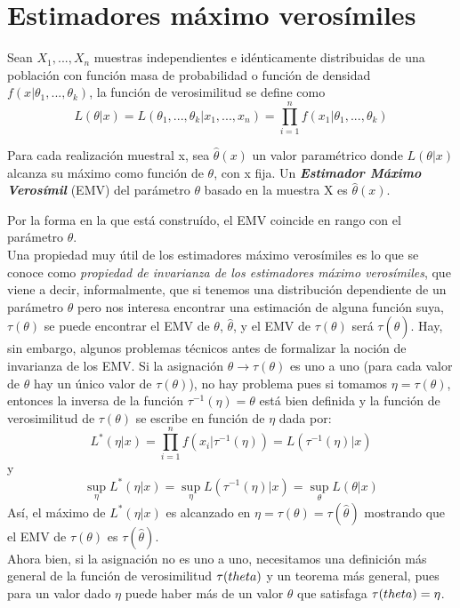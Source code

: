 \section{Estimadores máximo verosímiles}\label{st:emv}
Sean $X_{1},...,X_{n}$ muestras independientes e idénticamente distribuidas de una población con función masa de probabilidad o función de densidad $f(x \vert \theta_{1},...,\theta_{k})$, la función de verosimilitud se define como
\[ L(\theta \vert x)=L(\theta_{1},...,\theta_{k} \vert x_{1},...,x_{n})=\prod_{i=1}^{n} f(x_{1} \vert \theta_{1},...,\theta_{k}) \]
\begin{definicion}
Para cada realización muestral x, sea $\hat{\theta}(x)$ un valor paramétrico donde $L(\theta \vert x)$ alcanza su máximo como función de $\theta$, con x fija. Un \textbf{\textit{Estimador Máximo Verosímil}} (EMV) del parámetro $\theta$ basado en la muestra X es $\hat{\theta}(x)$. \cite{garthwaite2002statistical} \end{definicion}
Por la forma en la que está construído, el EMV coincide en rango con el parámetro $\theta$.\\
Una propiedad muy útil de los estimadores máximo verosímiles es lo que se conoce como \textit{propiedad de invarianza de los estimadores máximo verosímiles}, que viene a decir, informalmente, que si tenemos una distribución dependiente de un parámetro $\theta$ pero nos interesa encontrar una estimación de alguna función suya, $\tau(\theta)$ se puede encontrar el EMV de $\theta$, $\hat{\theta}$, y el EMV de $\tau(\theta)$ será $\tau(\hat{\theta})$. Hay, sin embargo, algunos problemas técnicos antes de formalizar la noción de invarianza de los EMV. Si la asignación $\theta \rightarrow \tau(\theta)$ es uno a uno (para cada valor de $\theta$ hay un único valor de $\tau(\theta)$), no hay problema pues si tomamos $\eta = \tau(\theta)$, entonces la inversa de la función $\tau^{-1}(\eta)=\theta$ está bien definida y la función de verosimilitud de $\tau(\theta)$ se escribe en función de $\eta$ dada por: \[ L^{*}(\eta \vert x) = \prod_{i=1}^{n}f(x_{i} \vert \tau^{-1}(\eta)) = L(\tau^{-1}(\eta) \vert x) \]
y
\[ \sup_{\eta}L^{*}(\eta \vert x) = \sup_{\eta}L(\tau^{-1}(\eta) \vert x) = \sup_{\theta}L(\theta \vert x) \]
Así, el máximo de $L^{*}(\eta \vert x) $ es alcanzado en $\eta = \tau(\theta) = \tau(\hat{\theta})$ mostrando que el EMV de $\tau(\theta)$ es $\tau(\hat{\theta})$.\\
Ahora bien, si la asignación no es uno a uno, necesitamos una definición más general de  la función de verosimilitud $\tau(\\theta)$ y un teorema más general, pues para un valor dado $\eta$ puede haber más de un valor $\theta$ que satisfaga $\tau(\\theta) = \eta$.\\
